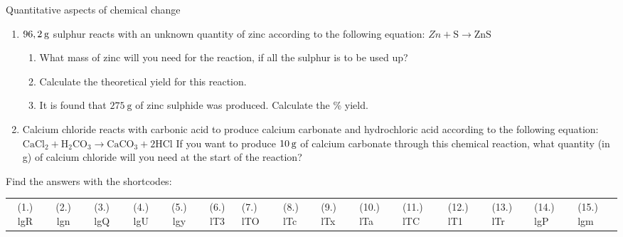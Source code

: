 \begin{eocexercises}{Quantitative aspects of chemical change}
\begin{enumerate}[noitemsep, label=\textbf{\arabic*}. ]
\begin{enumerate}[noitemsep, label=\textbf{\alph*}. ]
\end{enumerate}
                \label{m38717*uid64}\item $96,2\phantom{\rule{2pt}{0ex}}\text{g}$ sulphur reacts with an unknown quantity of zinc according to the following equation:
$Zn+\text{S}\to \text{ZnS}$\label{m38717*id280179}\begin{enumerate}[noitemsep, label=\textbf{\alph*}. ] 
            \label{m38717*uid65}\item What mass of zinc will you need for the reaction, if all the sulphur is to be used up?
\label{m38717*uid66}\item Calculate the theoretical yield for this reaction.
\item It is found that $275~\text{g}$ of zinc sulphide was produced. Calculate the \% yield.
\end{enumerate}
                \label{m38717*uid67}\item Calcium chloride reacts with carbonic acid to produce calcium carbonate and hydrochloric acid according to the following equation:
${\text{CaCl}}_{2}+{\text{H}}_{2}{\text{CO}}_{3}\to {\text{CaCO}}_{3}+2\text{HCl}$
If you want to produce $10\phantom{\rule{2pt}{0ex}}\text{g}$ of calcium carbonate through this chemical reaction, what quantity (in g) of calcium chloride will you need at the start of the reaction?\newline
                \end{enumerate}
  \label{m38712**end}
  \label{0044f0dab6cfd2ca2bac282dc4009886**end}
\par {} Find the answers with the shortcodes:
 \par \begin{tabular}[h]{cccccc}
 (1.) lgR  &  (2.) lgn  &  (3.) lgQ  &  (4.) lgU  &  (5.) lgy  &  (6.) lT3  &  (7.) lTO  &  (8.) lTc  &  (9.) lTx  &  (10.) lTa  &  (11.) lTC  &  (12.) lT1  &  (13.) lTr  &  (14.) lgP  &  (15.) lgm  & \end{tabular}
\end{eocexercises}

